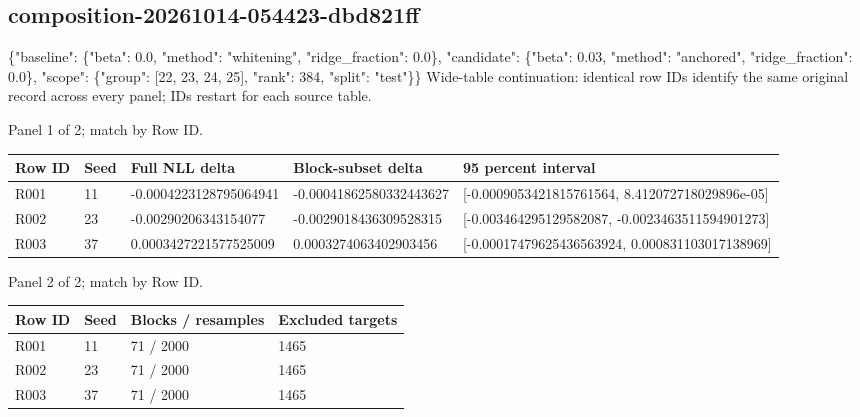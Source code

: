 \documentclass[10pt]{article}
\begin{document}
\subsection{composition-20261014-054423-dbd821ff}
\{"baseline": \{"beta": 0.0, "method": "whitening", "ridge\_fraction": 0.0\}, "candidate": \{"beta": 0.03, "method": "anchored", "ridge\_fraction": 0.0\}, "scope": \{"group": [22, 23, 24, 25], "rank": 384, "split": "test"\}\}
Wide-table continuation: identical row IDs identify the same original record across every panel; IDs restart for each source table.
\par\noindent Panel 1 of 2; match by Row ID.
{\scriptsize\setlength{\tabcolsep}{2pt}
\begin{longtable}{p{}p{}p{}p{}p{}}
Row ID & Seed & Full NLL delta & Block-subset delta & 95 percent interval \\
\hline\endhead
R001 & 11 & -0.0004223128795064941 & -0.00041862580332443627 & [-0.0009053421815761564, 8.412072718029896e-05] \\
R002 & 23 & -0.00290206343154077 & -0.0029018436309528315 & [-0.003464295129582087, -0.0023463511594901273] \\
R003 & 37 & 0.0003427221577525009 & 0.0003274063402903456 & [-0.00017479625436563924, 0.000831103017138969] \\
\end{longtable}}
\par\noindent Panel 2 of 2; match by Row ID.
{\scriptsize\setlength{\tabcolsep}{2pt}
\begin{longtable}{p{}p{}p{}p{}}
Row ID & Seed & Blocks / resamples & Excluded targets \\
\hline\endhead
R001 & 11 & 71 / 2000 & 1465 \\
R002 & 23 & 71 / 2000 & 1465 \\
R003 & 37 & 71 / 2000 & 1465 \\
\end{longtable}}
\end{document}
